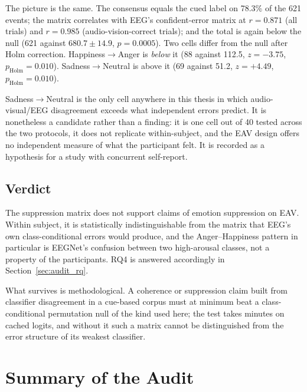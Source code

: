 The picture is the same. The consensus equals the cued label on 78.3\% of the 621
events; the matrix correlates with EEG's confident-error matrix at $r = 0.871$ (all
trials) and $r = 0.985$ (audio-vision-correct trials); and the total is again below the
null (621 against $680.7 \pm 14.9$, $p = 0.0005$). Two cells differ from the null after
Holm correction. Happiness$\rightarrow$Anger is \emph{below} it (88 against 112.5,
$z = -3.75$, $p_{\mathrm{Holm}} = 0.010$). Sadness$\rightarrow$Neutral is above it (69
against 51.2, $z = +4.49$, $p_{\mathrm{Holm}} = 0.010$).

Sadness$\rightarrow$Neutral is the only cell anywhere in this thesis in which
audio-visual/EEG disagreement exceeds what independent errors predict. It is
nonetheless a candidate rather than a finding: it is one cell out of 40 tested across
the two protocols, it does not replicate within-subject, and the EAV design offers no
independent measure of what the participant felt. It is recorded as a hypothesis for a
study with concurrent self-report.

\subsection{Verdict}

The suppression matrix does not support claims of emotion suppression on EAV. Within
subject, it is statistically indistinguishable from the matrix that EEG's own
class-conditional errors would produce, and the Anger--Happiness pattern in particular
is EEGNet's confusion between two high-arousal classes, not a property of the
participants. RQ4 is answered accordingly in Section~\ref{sec:audit_rq}.

What survives is methodological. A coherence or suppression claim built from
classifier disagreement in a cue-based corpus must at minimum beat a
class-conditional permutation null of the kind used here; the test takes minutes on
cached logits, and without it such a matrix cannot be distinguished from the error
structure of its weakest classifier.

\section{Summary of the Audit}
\label{sec:audit_summary}

